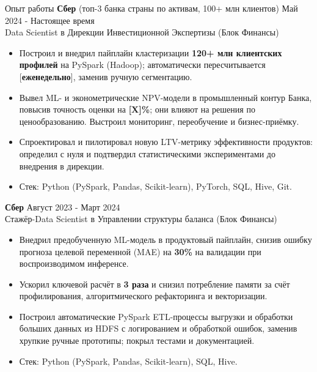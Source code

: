 \documentclass{resume} %
\begin{document}
	\begin{rSection}{Опыт работы}
		\textbf{Сбер} (топ-3 банка страны по активам, 100+ млн клиентов) \hfill {Май 2024 - Настоящее время}\\
		Data Scientist в Дирекции Инвестиционной Экспертизы (Блок Финансы) \\
		\vspace{-1.25em}
		\begin{itemize}
			\itemsep -3pt {}
			\item Построил и внедрил пайплайн кластеризации \textbf{120+ млн клиентских профилей} на PySpark (Hadoop); автоматически пересчитывается [\textbf{еженедельно}], заменив ручную сегментацию.
			\item Вывел ML- и эконометрические NPV-модели в промышленный контур Банка, повысив точность оценки на \textbf{[X]\%}; они влияют на решения по ценообразованию. Выстроил мониторинг, переобучение и бизнес-приёмку.
			\item Спроектировал и пилотировал новую LTV-метрику эффективности продуктов: определил с нуля и подтвердил статистическими экспериментами до внедрения в дирекции.
			\item Стек: Python (PySpark, Pandas, Scikit-learn), PyTorch, SQL, Hive, Git.
		\end{itemize}
			
		\textbf{Сбер} \hfill {Август 2023 - Март 2024}\\
		Стажёр-Data Scientist в Управлении структуры баланса (Блок Финансы) \\
		\vspace{-1.25em}
		\begin{itemize}
			\itemsep -3pt {}
			\item Внедрил предобученную ML-модель в продуктовый пайплайн, снизив ошибку прогноза целевой переменной (MAE) на \textbf{30\%} на валидации при воспроизводимом инференсе.
			\item Ускорил ключевой расчёт в \textbf{3 раза} и снизил потребление памяти за счёт профилирования, алгоритмического рефакторинга и векторизации.
			\item Построил автоматические PySpark ETL-процессы выгрузки и обработки больших данных из HDFS с логированием и обработкой ошибок, заменив хрупкие ручные прототипы; покрыл тестами и документацией.
			\item Стек: Python (PySpark, Pandas, Scikit-learn), SQL, Hive.
		\end{itemize}
	\end{rSection}
\end{document}
